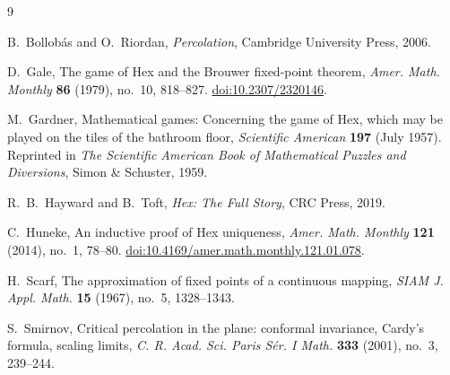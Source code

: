 \documentclass[11pt,a4paper]{amsart}
\theoremstyle{definition}
\theoremstyle{remark}
\begin{document}
\begin{thebibliography}{9}

B.~Bollob\'as and O.~Riordan, \emph{Percolation}, Cambridge University Press, 2006.

D.~Gale, The game of Hex and the Brouwer fixed-point theorem, \emph{Amer. Math. Monthly} \textbf{86} (1979), no.~10, 818--827. \href{https://doi.org/10.2307/2320146}{doi:10.2307/2320146}.

M.~Gardner, Mathematical games: Concerning the game of Hex, which may be played on the tiles of the bathroom floor, \emph{Scientific American} \textbf{197} (July 1957). Reprinted in \emph{The Scientific American Book of Mathematical Puzzles and Diversions}, Simon \& Schuster, 1959.

R.~B.~Hayward and B.~Toft, \emph{Hex: The Full Story}, CRC Press, 2019.

C.~Huneke, An inductive proof of Hex uniqueness, \emph{Amer. Math. Monthly} \textbf{121} (2014), no.~1, 78--80. \href{https://doi.org/10.4169/amer.math.monthly.121.01.078}{doi:10.4169/amer.math.monthly.121.01.078}.

H.~Scarf, The approximation of fixed points of a continuous mapping, \emph{SIAM J. Appl. Math.} \textbf{15} (1967), no.~5, 1328--1343.

S.~Smirnov, Critical percolation in the plane: conformal invariance, Cardy's formula, scaling limits, \emph{C. R. Acad. Sci. Paris S\'er. I Math.} \textbf{333} (2001), no.~3, 239--244.

\end{thebibliography}
\end{document}
